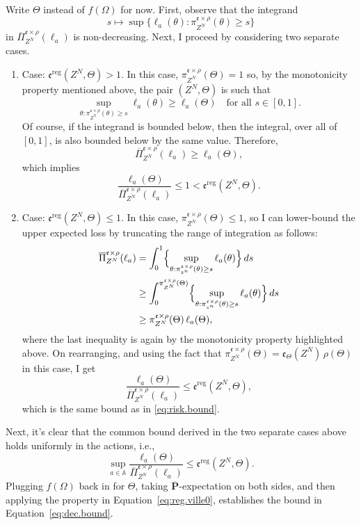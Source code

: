 \documentclass[a4paper, 12pt]{article}
\theoremstyle{plain}
\theoremstyle{definition}
\theoremstyle{remark}
\renewcommand{\AA}{\mathbb{A}}
\newcommand{\uPi}{\overline{\Pi}}
\newcommand{\uuprob}{\mathbf{\overline{P}}}
\newcommand{\eval}{\mathfrak{e}}
\begin{document}
Write $\Theta$ instead of $f(\Omega)$ for now.  First, observe that the integrand 
\[ s \mapsto \sup\{\ell_a(\theta): \pi_{Z^N}^{\eval \times \rho}(\theta) \geq s\} \]
in $\uPi_{Z^N}^{\eval \times \rho}(\ell_a)$ is non-decreasing.  Next, I proceed by considering two separate cases.  
\begin{enumerate}
\item Case: $\eval^\text{reg}(Z^N,\Theta) > 1$.  In this case,  $\pi_{Z^N}^{\eval \times \rho}(\Theta) = 1$ so, by the monotonicity property mentioned above, the pair $(Z^N,\Theta)$ is such that 
\[ \sup_{\theta: \pi_{Z^N}^{\eval \times \rho}(\theta) \geq s} \ell_a(\theta) \geq \ell_a(\Theta) \quad \text{for all $s \in [0,1]$}. \]
Of course, if the integrand is bounded below, then the integral, over all of $[0,1]$, is also bounded below by the same value.  Therefore, 
\[ \uPi_{Z^N}^{\eval \times \rho}(\ell_a) \geq \ell_a(\Theta), \]
which implies 
\begin{equation}
\label{eq:risk.bound}
\frac{\ell_a(\Theta)}{\uPi_{Z^N}^{\eval \times \rho}(\ell_a)} \leq 1 < \eval^\text{reg}(Z^N,\Theta). 
\end{equation}
\item Case: $\eval^\text{reg}(Z^N,\Theta) \leq 1$.  In this case, $\pi_{Z^N}^{\eval \times \rho}(\Theta) \leq 1$, so I can lower-bound the upper expected loss by truncating the range of integration as follows:
\begin{align*}
\uPi_{Z^N}^{\eval \times \rho}(\ell_a) & = \int_0^1 \Bigl\{ \sup_{\theta: \pi_{z^n}^{\eval \times \rho}(\theta) \geq s} \ell_a(\theta) \Bigr\} \, ds \\
& \geq \int_0^{\pi_{Z^N}^{\eval \times \rho}(\Theta)} \Bigl\{ \sup_{\theta: \pi_{z^n}^{\eval \times \rho}(\theta) \geq s} \ell_a(\theta) \Bigr\} \, ds \\
& \geq \pi_{Z^N}^{\eval \times \rho}(\Theta) \, \ell_a(\Theta),
\end{align*}
where the last inequality is again by the monotonicity property highlighted above.  On rearranging, and using the fact that $\pi_{Z^N}^{\eval \times \rho}(\Theta) = \eval_\Theta(Z^N) \, \rho(\Theta)$ in this case, I get 
\[ \frac{\ell_a(\Theta)}{\uPi_{Z^N}^{\eval \times \rho}(\ell_a)} \leq \eval^\text{reg}(Z^N,\Theta), \]
which is the same bound as in \eqref{eq:risk.bound}.  
\end{enumerate} 
Next, it's clear that the common bound derived in the two separate cases above holds uniformly in the actions, i.e., 
\[ \sup_{a \in \AA} \frac{\ell_a(\Theta)}{\uPi_{Z^N}^{\eval \times \rho}(\ell_a)} \leq \eval^\text{reg}(Z^N,\Theta). \]
Plugging $f(\Omega)$ back in for $\Theta$, taking $\uuprob$-expectation on both sides, and then applying the property in Equation~\eqref{eq:reg.ville0}, establishes the bound in Equation~\eqref{eq:dec.bound}. 






\end{document}
